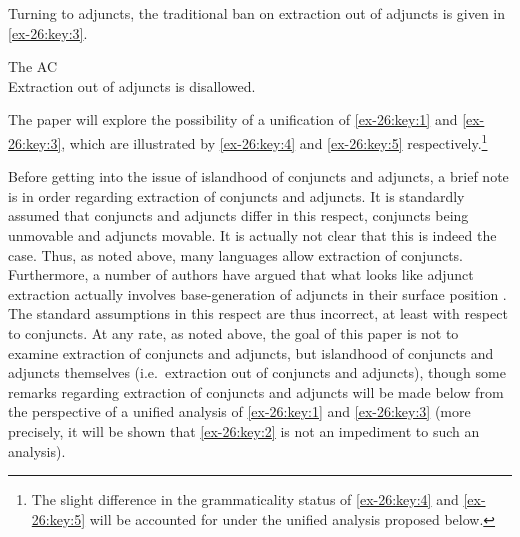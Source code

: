 \documentclass[output=paper]{langsci/langscibook}
\begin{document}
Turning to adjuncts, the traditional ban on extraction out of adjuncts is given
in \eqref{ex-26:key:3}.

\ea\label{ex-26:key:3}The \gls{AC}\\
	Extraction out of adjuncts is disallowed.
\z

The paper will explore the possibility of a unification of \eqref{ex-26:key:1} and \eqref{ex-26:key:3}, which
are illustrated by \eqref{ex-26:key:4} and \eqref{ex-26:key:5} respectively.\footnote{The slight difference in
the grammaticality status of \eqref{ex-26:key:4} and \eqref{ex-26:key:5} will be accounted for under the
unified analysis proposed below.}

%
    \label{ex-26:key:4}
\z

%
    \label{ex-26:key:5}
\z

Before getting into the issue of islandhood of conjuncts and adjuncts, a brief
note is in order regarding extraction of conjuncts and adjuncts. It is
standardly assumed that conjuncts and adjuncts differ in this respect,
conjuncts being unmovable and adjuncts movable. It is actually not clear that
this is indeed the case. Thus, as noted above, many languages allow extraction
of conjuncts. Furthermore, a number of authors have argued that what looks like
adjunct extraction actually involves base-generation of adjuncts in their
surface position \parencite[e.g.][]{Uriagereka1988,Law1993,Stepanov2001a}. The
standard assumptions in this respect are thus incorrect, at least with respect
to conjuncts. At any rate, as noted above, the goal of this paper is not to
examine extraction of conjuncts and adjuncts, but islandhood of conjuncts and
adjuncts themselves (i.e.\ extraction out of conjuncts and adjuncts), though
some remarks regarding extraction of conjuncts and adjuncts will be made below
from the perspective of a unified analysis of \eqref{ex-26:key:1} and \eqref{ex-26:key:3} (more precisely, it
will be shown that \eqref{ex-26:key:2} is not an impediment to such an analysis).
\end{document}
